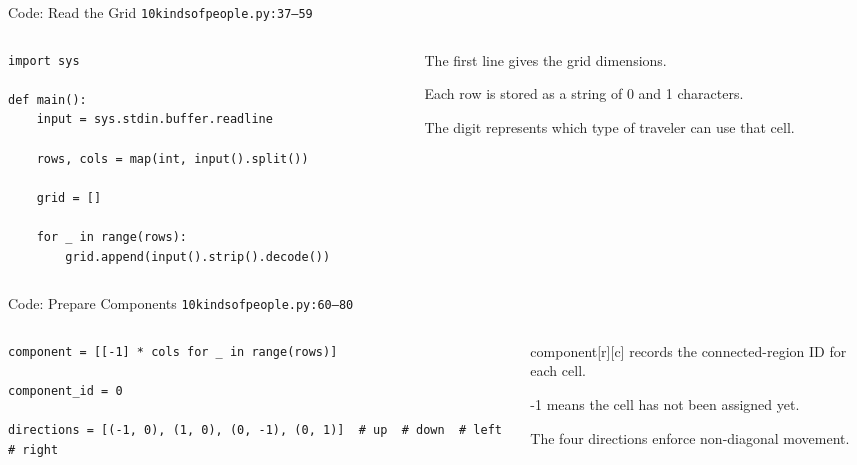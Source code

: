 \documentclass[aspectratio=169,11pt]{beamer}
\begin{document}
\begin{frame}[fragile]{Code: Read the Grid}
\scriptsize
{} \texttt{10kindsofpeople.py:37--59}

\vspace{0.08cm}
\begin{columns}[T,totalwidth=\textwidth]
\begin{column}{0.58\textwidth}
\begin{lstlisting}[style=cpcode]
import sys

def main():
    input = sys.stdin.buffer.readline

    rows, cols = map(int, input().split())

    grid = []

    for _ in range(rows):
        grid.append(input().strip().decode())
\end{lstlisting}
\end{column}
\begin{column}{0.38\textwidth}
\begin{tightitemize}
  \item The first line gives the grid dimensions.
  \item Each row is stored as a string of 0 and 1 characters.
  \item The digit represents which type of traveler can use that cell.
\end{tightitemize}
\end{column}
\end{columns}
\end{frame}

\begin{frame}[fragile]{Code: Prepare Components}
\scriptsize
{} \texttt{10kindsofpeople.py:60--80}

\vspace{0.08cm}
\begin{columns}[T,totalwidth=\textwidth]
\begin{column}{0.58\textwidth}
\begin{lstlisting}[style=cpcode]
component = [[-1] * cols for _ in range(rows)]

component_id = 0

directions = [(-1, 0), (1, 0), (0, -1), (0, 1)]  # up  # down  # left  # right
\end{lstlisting}
\end{column}
\begin{column}{0.38\textwidth}
\begin{tightitemize}
  \item component[r][c] records the connected-region ID for each cell.
  \item -1 means the cell has not been assigned yet.
  \item The four directions enforce non-diagonal movement.
\end{tightitemize}
\end{column}
\end{columns}
\end{frame}
\end{document}
